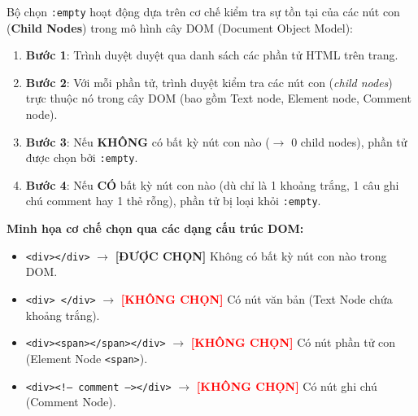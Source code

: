 \documentclass[11pt,oneside]{book}
\newcommand{\codeinline}[1]{\textcolor{accentOrange}{\texttt{#1}}}
\newcommand{\term}[1]{\textbf{\textcolor{primaryBlue}{#1}}}
\begin{document}
\begin{conceptBox}
Bộ chọn \codeinline{:empty} hoạt động dựa trên cơ chế kiểm tra sự tồn tại của các nút con (\term{Child Nodes}) trong mô hình cây DOM (Document Object Model):
\begin{enumerate}[leftmargin=1.5em, itemsep=3pt, parsep=0pt]
    \item \textbf{Bước 1}: Trình duyệt duyệt qua danh sách các phần tử HTML trên trang.
    \item \textbf{Bước 2}: Với mỗi phần tử, trình duyệt kiểm tra các nút con (\textit{child nodes}) trực thuộc nó trong cây DOM (bao gồm Text node, Element node, Comment node).
    \item \textbf{Bước 3}: Nếu \textbf{KHÔNG} có bất kỳ nút con nào ($\rightarrow$ 0 child nodes), phần tử được chọn bởi \codeinline{:empty}.
    \item \textbf{Bước 4}: Nếu \textbf{CÓ} bất kỳ nút con nào (dù chỉ là 1 khoảng trắng, 1 câu ghi chú comment hay 1 thẻ rỗng), phần tử bị loại khỏi \codeinline{:empty}.
\end{enumerate}
\par\vspace{4pt}
\textbf{Minh họa cơ chế chọn qua các dạng cấu trúc DOM:}
\begin{itemize}[leftmargin=1.5em, itemsep=2pt, parsep=0pt]
    \item \codeinline{<div></div>} $\rightarrow$ \textcolor{green!60!black}{\textbf{[ĐƯỢC CHỌN]}} Không có bất kỳ nút con nào trong DOM.
    \item \codeinline{<div> </div>} $\rightarrow$ \textcolor{red}{\textbf{[KHÔNG CHỌN]}} Có nút văn bản (Text Node chứa khoảng trắng).
    \item \codeinline{<div><span></span></div>} $\rightarrow$ \textcolor{red}{\textbf{[KHÔNG CHỌN]}} Có nút phần tử con (Element Node \codeinline{<span>}).
    \item \codeinline{<div><!-- comment --></div>} $\rightarrow$ \textcolor{red}{\textbf{[KHÔNG CHỌN]}} Có nút ghi chú (Comment Node).
\end{itemize}
\end{conceptBox}
\end{document}
